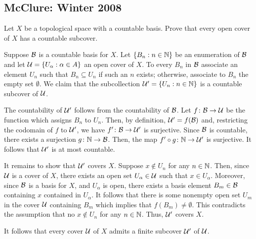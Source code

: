 \subsection{McClure: Winter 2008}
\setcounter{exercise}{0}

\begin{problem}
  Let \(X\) be a topological space with a countable basis. Prove that every
  open cover of \(X\) has a countable subcover.
\end{problem}
\begin{solution}
  Suppose \(\mathcal{B}\) is a countable basis for \(X\). Let
  \(\{B_n:n\in\mathbb{N}\}\) be an enumeration of \(\mathcal{B}\) and let
  \(\mathcal{U}=\{U_\alpha:\alpha\in A\}\) an open cover of \(X\). To every
  \(B_n\) in \(\mathcal{B}\) associate an element \(U_n\) such that
  \(B_n\subseteq U_n\) if such an \(n\) exists; otherwise, associate to
  \(B_n\) the empty set \(\emptyset\). We claim that the subcollection
  \(\mathcal{U}'=\{U_n:n\in\mathbb{N}\}\) is a countable subcover of \(\mathcal{U}\).

  The countability of \(\mathcal{U}'\) follows from the countability of
  \(\mathcal{B}\). Let \(f\colon\mathcal{B}\to\mathcal{U}\) be the function which assigns
  \(B_n\) to \(U_n\). Then, by definition, \(\mathcal{U}'=f(\mathcal{B})\) and,
  restricting the codomain of \(f\) to \(\mathcal{U}'\), we have
  \(f'\colon\mathcal{B}\to\mathcal{U}'\) is surjective. Since \(\mathcal{B}\) is countable,
  there exists a surjection \(g\colon\mathbb{N}\to\mathcal{B}\). Then, the map
  \(f'\circ g\colon\mathbb{N}\to\mathcal{U}'\) is surjective. It follows that
  \(\mathcal{U}'\) is at most countable.

  It remains to show that \(\mathcal{U}'\) covers \(X\). Suppose \(x\notin U_n\)
  for any \(n\in\mathbb{N}\). Then, since \(\mathcal{U}\) is a cover of \(X\), there
  exists an open set \(U_\alpha\in\mathcal{U}\) such that \(x\in
  U_\alpha\). Moreover, since \(\mathcal{B}\) is a basis for \(X\), and
  \(U_\alpha\) is open, there exists a basis element \(B_m\in\mathcal{B}\)
  containing \(x\) contained in \(U_\alpha\). It follows that there is some
  nonempty open set \(U_m\) in the cover \(\mathcal{U}\) containing \(B_m\) which
  implies that \(f(B_m)\neq\emptyset\). This contradicts the assumption
  that no \(x\notin U_n\) for any \(n\in\mathbb{N}\). Thus, \(\mathcal{U}'\) covers
  \(X\).

  It follows that every cover \(\mathcal{U}\) of \(X\) admits a finite subcover
  \(\mathcal{U}'\) of \(\mathcal{U}\).
\end{solution}

